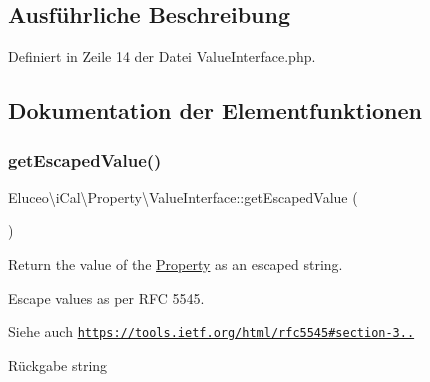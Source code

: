 \subsection{Ausführliche Beschreibung}


Definiert in Zeile 14 der Datei Value\+Interface.\+php.



\subsection{Dokumentation der Elementfunktionen}
\mbox{\label{interface_eluceo_1_1i_cal_1_1_property_1_1_value_interface_a408412ae5d11fd3f239c7985aede8c32}} 
\subsubsection{\texorpdfstring{get\+Escaped\+Value()}{getEscapedValue()}\hspace{0.1cm}{\footnotesize\ttfamily [1/3]}}
{\footnotesize\ttfamily Eluceo\textbackslash{}i\+Cal\textbackslash{}\+Property\textbackslash{}\+Value\+Interface\+::get\+Escaped\+Value (\begin{DoxyParamCaption}{ }\end{DoxyParamCaption})}

Return the value of the \mbox{\hyperlink{class_eluceo_1_1i_cal_1_1_property}{Property}} as an escaped string.

Escape values as per R\+FC 5545.

\begin{DoxySeeAlso}{Siehe auch}
\href{https://tools.ietf.org/html/rfc5545#section-3.3.11}{\tt https\+://tools.\+ietf.\+org/html/rfc5545\#section-\/3..}
\end{DoxySeeAlso}
\begin{DoxyReturn}{Rückgabe}
string 
\end{DoxyReturn}


